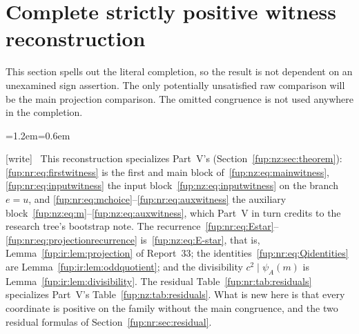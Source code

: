 \documentclass[11pt,letterpaper]{article}
\theoremstyle{definition}\newtheorem{definition}[theorem]{Definition}
\theoremstyle{remark}\newtheorem{remark}[theorem]{Remark}
\newcommand{\wtag}{\textup{[write]}}
\newenvironment{writenote}{\par\smallskip\begin{list}{}{\leftmargin=1.2em\rightmargin=0.6em}\item[]\small\wtag\ }{\end{list}\smallskip}
\begin{document}
\section{Complete strictly positive witness reconstruction}\label{fup:nr:sec:reconstruction}
This section spells out the literal completion, so the result is not dependent on an unexamined sign assertion. The only potentially unsatisfied raw comparison will be the main projection comparison. The omitted congruence is not used anywhere in the completion.
\begin{writenote}
This reconstruction specializes Part~V's (Section~\ref{fup:nz:sec:theorem}): \eqref{fup:nr:eq:firstwitness} is the first and main block of~\eqref{fup:nz:eq:mainwitness}, \eqref{fup:nr:eq:inputwitness} the input block~\eqref{fup:nz:eq:inputwitness} on the branch $e=u$, and \eqref{fup:nr:eq:mchoice}--\eqref{fup:nr:eq:auxwitness} the auxiliary block~\eqref{fup:nz:eq:m}--\eqref{fup:nz:eq:auxwitness}, which Part~V in turn credits to the research tree's bootstrap note. The recurrence~\eqref{fup:nr:eq:Estar}--\eqref{fup:nr:eq:projectionrecurrence} is~\eqref{fup:nz:eq:E-star}, that is, Lemma~\ref{fup:ir:lem:projection} of Report~33; the identities~\eqref{fup:nr:eq:Qidentities} are Lemma~\ref{fup:ir:lem:oddquotient}; and the divisibility $c^2\mid\psi_A(m)$ is Lemma~\ref{fup:ir:lem:divisibility}. The residual Table~\ref{fup:nr:tab:residuals} specializes Part~V's Table~\ref{fup:nz:tab:residuals}. What is new here is that every coordinate is positive on the family without the main congruence, and the two residual formulas of Section~\ref{fup:nr:sec:residual}.
\end{writenote}
\end{document}
